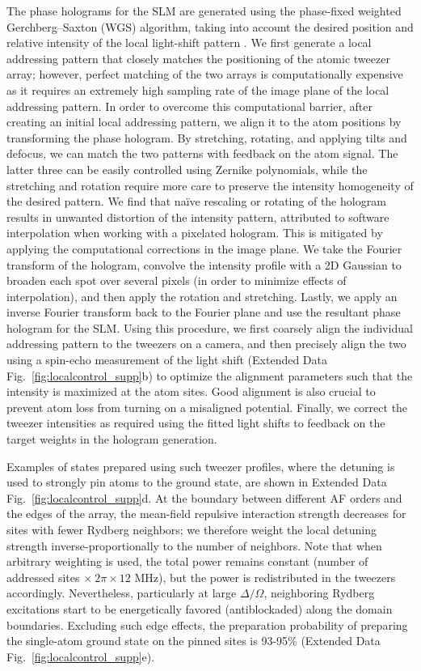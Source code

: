 \documentclass[reprint,twocolumn,secnumarabic,amssymb, aps, prx]{revtex4-2}
\begin{document}
The phase holograms for the SLM are generated using the phase-fixed weighted Gerchberg–Saxton (WGS) algorithm, taking into account the desired position and relative intensity of the local light-shift pattern \cite{dongyukimGS}. We first generate a local addressing pattern that closely matches the positioning of the atomic tweezer array; however, perfect matching of the two arrays is computationally expensive as it requires an extremely high sampling rate of the image plane of the local addressing pattern. In order to overcome this computational barrier, after creating an initial local addressing pattern, we align it to the atom positions by transforming the phase hologram. By stretching, rotating, and applying tilts and defocus, we can match the two patterns with feedback on the atom signal. The latter three can be easily  controlled using Zernike polynomials, while the stretching and rotation require more care to preserve the intensity homogeneity of the desired pattern. We find that na\"ive rescaling or rotating of the hologram results in unwanted distortion of the intensity pattern, attributed to software interpolation when working with a pixelated hologram. This is mitigated by applying the computational corrections in the image plane. We take the Fourier transform of the hologram, convolve the intensity profile with a 2D Gaussian to broaden each spot over several pixels (in order to minimize effects of interpolation), and then apply the rotation and stretching. Lastly, we apply an inverse Fourier transform back to the Fourier plane and use the resultant phase hologram for the SLM. 
Using this procedure, we first coarsely align the individual addressing pattern to the tweezers on a camera, and then precisely align the two using a spin-echo measurement of the light shift (Extended Data Fig.~\ref{fig:localcontrol_supp}b) to optimize the alignment parameters such that the intensity is maximized at the atom sites. Good alignment is also crucial to prevent atom loss from turning on a misaligned potential.
Finally, we correct the tweezer intensities as required  using the fitted light shifts to feedback on the target weights in the hologram generation. 

Examples of states prepared using such tweezer profiles, where the detuning is used to strongly pin atoms to the ground state, are shown in Extended Data Fig.~\ref{fig:localcontrol_supp}d. At the boundary between different AF orders and the edges of the array, the mean-field repulsive interaction strength decreases for sites with fewer Rydberg neighbors; we therefore weight the local detuning strength inverse-proportionally to the number of neighbors. Note that when arbitrary weighting is used, the total power remains constant (number of addressed sites $\times~2\pi\times12$ MHz), but the power is redistributed in the tweezers accordingly. Nevertheless, particularly at large $\Delta/\Omega$, neighboring Rydberg excitations start to be energetically favored (antiblockaded) along the domain boundaries. Excluding such edge effects, the preparation probability of preparing the single-atom ground state on the pinned sites is 93-95\% (Extended Data Fig.~\ref{fig:localcontrol_supp}e).
\end{document}
